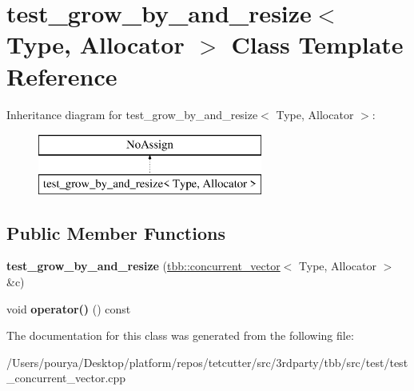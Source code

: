 \hypertarget{classtest__grow__by__and__resize}{}\section{test\+\_\+grow\+\_\+by\+\_\+and\+\_\+resize$<$ Type, Allocator $>$ Class Template Reference}
\label{classtest__grow__by__and__resize}
Inheritance diagram for test\+\_\+grow\+\_\+by\+\_\+and\+\_\+resize$<$ Type, Allocator $>$\+:\begin{figure}[H]
\begin{center}
\leavevmode
\includegraphics[height=2.000000cm]{classtest__grow__by__and__resize}
\end{center}
\end{figure}
\subsection*{Public Member Functions}
\begin{DoxyCompactItemize}
\item 
\hypertarget{classtest__grow__by__and__resize_a945fe903830982a674c7de95e9a027d1}{}{\bfseries test\+\_\+grow\+\_\+by\+\_\+and\+\_\+resize} (\hyperlink{classtbb_1_1concurrent__vector}{tbb\+::concurrent\+\_\+vector}$<$ Type, Allocator $>$ \&c)\label{classtest__grow__by__and__resize_a945fe903830982a674c7de95e9a027d1}

\item 
\hypertarget{classtest__grow__by__and__resize_a551c03d77d669d178d098b44cb93620e}{}void {\bfseries operator()} () const \label{classtest__grow__by__and__resize_a551c03d77d669d178d098b44cb93620e}

\end{DoxyCompactItemize}


The documentation for this class was generated from the following file\+:\begin{DoxyCompactItemize}
\item 
/\+Users/pourya/\+Desktop/platform/repos/tetcutter/src/3rdparty/tbb/src/test/test\+\_\+concurrent\+\_\+vector.\+cpp\end{DoxyCompactItemize}
